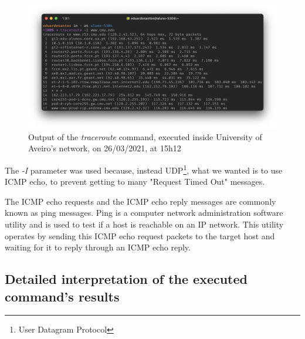 \documentclass{article}
\begin{document}
\begin{figure}[H]
    \includegraphics[width=1 \textwidth]{images/tracerouteUA.png}
    \caption{Output of the \textit{traceroute} command, executed inside University of Aveiro's network, on 26/03/2021, at 15h12}
    \label{tracerouteUA}
\end{figure}


The \textit{-I} parameter was used because, instead UDP\footnote{User Datagram Protocol}, what we wanted is to use ICMP echo, to prevent getting to many "Request Timed Out" messages. 

The ICMP echo requests and the ICMP echo reply messages are commonly known as ping messages. Ping is a computer network administration software utility and is used to test if a host is reachable on an IP network. This utility operates by sending this ICMP echo request packets to the target host and waiting for it to reply through an ICMP echo reply.

\subsection{Detailed interpretation of the executed command's results}
\end{document}
